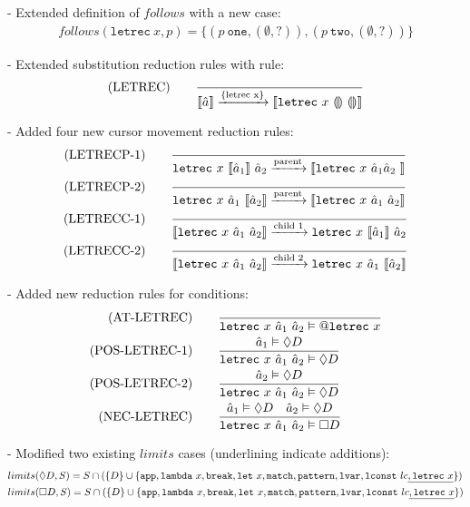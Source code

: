\documentclass[10pt,a4paper,english]{article}
\newcommand\letrec[3]{\texttt{letrec}~#1~#2~#3}
\begin{document}
- Extended definition of $follows$ with a new case:
\begin{align}
follows(\texttt{letrec}~x, p) = \{ (p~\texttt{one}, (\emptyset, ?)), (p~\texttt{two}, (\emptyset, ?)) \}
\end{align}



- Extended substitution reduction rules with rule:
\begin{align}
(\text{LETREC})\qquad
\frac{}{\cursor{\hat{a}}\transition{\{letrec x\}}\cursor{\letrec{x}{\hole}{\hole}}}
\end{align}

- Added four new cursor movement reduction rules:
\begin{align}
  (\text{LETRECP-1}) \qquad &\frac{}{\letrec{x}{\cursor{\hat{a}_1}}{\hat{a}_2}\transition{parent}\cursor{\letrec{x}{\hat{a}_1{\hat{a}_2}}}}\\
(\text{LETRECP-2}) \qquad &\frac{}{\letrec{x}{\hat{a}_1}{\cursor{\hat{a}_2}}\transition{parent}\cursor{\letrec{x}{\hat{a}_1}{\hat{a}_2}}}\\
(\text{LETRECC-1}) \qquad &\frac{}{\cursor{\letrec{x}{\hat{a}_1}{\hat{a}_2}}\transition{child 1}\letrec{x}{\cursor{\hat{a}_1}}{\hat{a}_2}}\\
(\text{LETRECC-2}) \qquad &\frac{}{\cursor{\letrec{x}{\hat{a}_1}{\hat{a}_2}}\transition{child 2}\letrec{x}{\hat{a}_1}{\cursor{\hat{a}_2}}}
\end{align}

- Added new reduction rules for conditions:
\begin{align}
  (\text{AT-LETREC})\qquad&\frac{}{\letrec{x}{\hat{a}_1}{\hat{a}_2} \vDash \at\texttt{letrec}~x}\\
  (\text{POS-LETREC-1})\qquad&\frac{\hat{a}_1\vDash\possibly D}{\letrec{x}{\hat{a}_1}{\hat{a}_2} \vDash \possibly D}\\
  (\text{POS-LETREC-2})\qquad&\frac{\hat{a}_2\vDash\possibly D}{\letrec{x}{\hat{a}_1}{\hat{a}_2} \vDash \possibly D}\\
  (\text{NEC-LETREC})\qquad&\frac{\hat{a}_1\vDash\possibly D \quad \hat{a}_2\vDash\possibly D}{\letrec{x}{\hat{a}_1}{\hat{a}_2} \vDash \necessarily D}
\end{align}

- Modified two existing $limits$ cases (underlining indicate additions):
\begin{align}
&limits(\Diamond D, S) = S \cap (\{D\} \cup \{\texttt{app}, \texttt{lambda}~x, \texttt{break}, \texttt{let}~x, \texttt{match}, \texttt{pattern}, \texttt{lvar}, \texttt{lconst}~lc \underline{, \texttt{letrec}~x}\})\\
&limits(\Box D, S) = S \cap (\{D\} \cup \{\texttt{app}, \texttt{lambda}~x, \texttt{break}, \texttt{let}~x, \texttt{match}, \texttt{pattern}, \texttt{lvar}, \texttt{lconst}~lc \underline{,  \texttt{letrec}~x} \})
\end{align}
\end{document}
